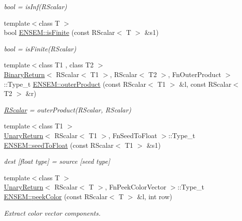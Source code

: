 \begin{DoxyCompactItemize}
\begin{DoxyCompactList}\small\item\em bool = is\+Inf(\+R\+Scalar) \end{DoxyCompactList}\item 
{\footnotesize template$<$class T $>$ }\\bool \mbox{\hyperlink{group__rscalar_ga7ec54fb1eaedacb87a42df35a5f11001}{E\+N\+S\+E\+M\+::is\+Finite}} (const R\+Scalar$<$ T $>$ \&s1)
\begin{DoxyCompactList}\small\item\em bool = is\+Finite(\+R\+Scalar) \end{DoxyCompactList}\item 
{\footnotesize template$<$class T1 , class T2 $>$ }\\\mbox{\hyperlink{structBinaryReturn}{Binary\+Return}}$<$ R\+Scalar$<$ T1 $>$, R\+Scalar$<$ T2 $>$, Fn\+Outer\+Product $>$\+::Type\+\_\+t \mbox{\hyperlink{group__rscalar_ga15f13b29160f342d113127c8d71db613}{E\+N\+S\+E\+M\+::outer\+Product}} (const R\+Scalar$<$ T1 $>$ \&l, const R\+Scalar$<$ T2 $>$ \&r)
\begin{DoxyCompactList}\small\item\em \mbox{\hyperlink{classENSEM_1_1RScalar}{R\+Scalar}} = outer\+Product(\+R\+Scalar, R\+Scalar) \end{DoxyCompactList}\item 
{\footnotesize template$<$class T1 $>$ }\\\mbox{\hyperlink{structUnaryReturn}{Unary\+Return}}$<$ R\+Scalar$<$ T1 $>$, Fn\+Seed\+To\+Float $>$\+::Type\+\_\+t \mbox{\hyperlink{group__rscalar_gaaeb1321ab6946f99106e2a50f9098353}{E\+N\+S\+E\+M\+::seed\+To\+Float}} (const R\+Scalar$<$ T1 $>$ \&s1)
\begin{DoxyCompactList}\small\item\em dest \mbox{[}float type\mbox{]} = source \mbox{[}seed type\mbox{]} \end{DoxyCompactList}\item 
{\footnotesize template$<$class T $>$ }\\\mbox{\hyperlink{structUnaryReturn}{Unary\+Return}}$<$ R\+Scalar$<$ T $>$, Fn\+Peek\+Color\+Vector $>$\+::Type\+\_\+t \mbox{\hyperlink{group__rscalar_ga9ab62185b545eeb3c9cad28b0c200430}{E\+N\+S\+E\+M\+::peek\+Color}} (const R\+Scalar$<$ T $>$ \&l, int row)
\begin{DoxyCompactList}\small\item\em Extract color vector components. \end{DoxyCompactList}\item 

\end{DoxyCompactItemize}
